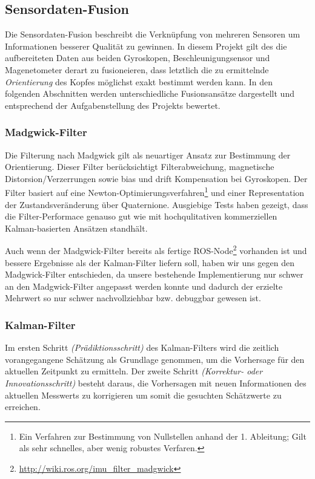 
\subsection{Sensordaten-Fusion}
\label{headtracking_fusion_subsec}
Die Sensordaten-Fusion beschreibt die Verknüpfung von mehreren Sensoren um Informationen besserer Qualität zu gewinnen. In diesem Projekt gilt des die aufbereiteten Daten aus beiden Gyroskopen, Beschleunigungsensor und Magenetometer derart zu fusioneieren, dass letztlich die zu ermittelnde \emph{Orientierung} des Kopfes möglichst exakt bestimmt werden kann. In den folgenden Abschnitten werden unterschiedliche Fusionsansätze dargestellt und entsprechend der Aufgabenstellung des Projekts bewertet. 

\subsubsection{Madgwick-Filter}
Die Filterung nach Madgwick \cite{madgwick2010efficient} gilt als neuartiger Ansatz zur Bestimmung der Orientierung. Dieser Filter berücksichtigt Filterabweichung, magnetische Distorsion/Verzerrungen sowie bias und drift Kompensation bei Gyroskopen. Der Filter basiert auf eine Newton-Optimierungsverfahren\footnote{Ein Verfahren zur Bestimmung von Nullstellen anhand der 1. Ableitung; Gilt als sehr schnelles, aber wenig robustes Verfaren.} und einer Representation der Zustandsveränderung über Quaternione. Ausgiebige Tests haben gezeigt, dass die Filter-Performace genauso gut wie mit hochqulitativen kommerziellen Kalman-basierten Ansätzen standhält.

Auch wenn der Madgwick-Filter bereits als fertige ROS-Node\footnote{\url{http://wiki.ros.org/imu_filter_madgwick}} vorhanden ist und  bessere Ergebnisse als der Kalman-Filter liefern soll, haben wir uns gegen den Madgwick-Filter entschieden, da unsere bestehende Implementierung nur schwer an den Madgwick-Filter angepasst werden konnte und dadurch der erzielte Mehrwert so nur schwer nachvollziehbar bzw. debuggbar gewesen ist. 


\subsubsection{Kalman-Filter}
Im ersten Schritt \emph{(Prädiktionsschritt)} des Kalman-Filters wird die zeitlich vorangegangene Schätzung als Grundlage genommen, um die Vorhersage für den aktuellen Zeitpunkt zu ermitteln. Der zweite Schritt \emph{(Korrektur- oder Innovationsschritt)} besteht daraus, die Vorhersagen mit neuen Informationen des aktuellen Messwerts zu korrigieren um somit die gesuchten Schätzwerte zu erreichen.

